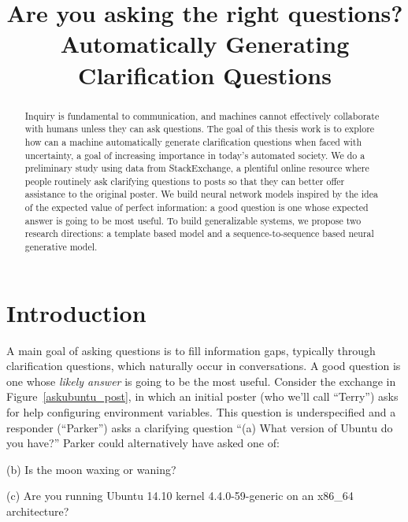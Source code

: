 \documentclass[11pt,a4paper]{article}
\title{Are you asking the right questions? \\ Automatically Generating Clarification Questions}
\date{}
\begin{document}
\maketitle
\begin{abstract}
	
Inquiry is fundamental to communication, and machines cannot effectively collaborate with humans unless they can ask questions. The goal of this thesis work is to explore how can a machine automatically generate clarification questions when faced with uncertainty, a goal of increasing importance in today's automated society. We do a preliminary study using data from StackExchange, a plentiful online resource where people routinely ask clarifying questions to posts so that they can better offer assistance to the original poster. We build neural network models inspired by the idea of the expected value of perfect information: a good question is one whose expected answer is going to be most useful.
To build generalizable systems, we propose two research directions: a template based model and a sequence-to-sequence based neural generative model.
\end{abstract}

\section{Introduction}\label{introduction}

A main goal of asking questions is to fill information gaps, typically through clarification questions, which naturally occur in conversations. 
A good question is one whose \emph{likely answer} is going to be the most useful.
Consider the exchange in Figure~\ref{askubuntu_post}, in which an initial poster (who we'll call ``Terry'') asks for help configuring environment variables.
This question is underspecified and a responder (``Parker'') asks a clarifying question ``\textsf{\small (a) What version of Ubuntu do you have?}''
Parker could alternatively have asked one of:

\textsf{\small(b) Is the moon waxing or waning?}

\textsf{\small(c) Are you running Ubuntu 14.10 kernel 4.4.0-59-generic on an x86\_64 architecture?}
\end{document}
